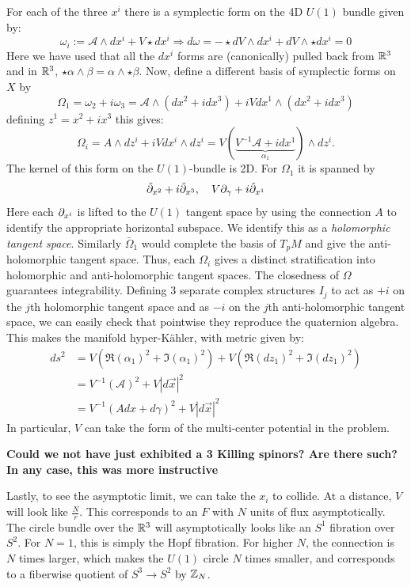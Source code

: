\documentclass[11pt, class=article, crop=false]{standalone}
\begin{document}
\begin{enumerate}
	For each of the three $x^i$ there is a symplectic form on the 4D $U(1)$ bundle given by: 
	\[
		\omega_i := \mathcal A \wedge dx^i + V \star dx^i \Rightarrow d \omega = - \star dV \wedge dx^i + dV \wedge \star dx^i = 0
	\]
	Here we have used that all the $dx^i$ forms are (canonically) pulled back from $\mathbb{R}^3$ and in $\mathbb{R}^3$, $\star \alpha \wedge \beta = \alpha \wedge \star \beta$. Now, define a different basis of symplectic forms on $X$ by
	\[
		\Omega_1 = \omega_2 + i \omega_3 = \mathcal A \wedge (dx^2 + i dx^3) + i V dx^1 \wedge (dx^2 + i dx^3) 
	\]
	defining $z^1 = x^2 + i x^3$ this gives:
	\[
		\Omega_i = A \wedge dz^i + i V dx^i \wedge dz^i = V (\underbrace{V^{-1} \mathcal A + i dx^1}_{\alpha_1}) \wedge dz^i.
	\]
	The kernel of this form on the $U(1)$-bundle is 2D. For $\Omega_1$ it is spanned by 
	\[
		\tilde {\partial}_{x^2} + i \tilde {\partial}_{x^3}, \quad V \partial_\gamma + i \tilde {\partial}_{x^1}
	\]
	Here each $\partial_{x^i}$ is lifted to the $U(1)$ tangent space by using the connection $A$ to identify the appropriate horizontal subspace. We identify this as a \emph{holomorphic tangent space}. Similarly $\bar \Omega_1$ would complete the basis of $T_p M$ and give the anti-holomorphic tangent space. Thus, each $\Omega_i$ gives a distinct stratification into holomorphic and anti-holomorphic tangent spaces. The closedness of $\Omega$ guarantees integrability. Defining 3 separate complex structures $I_j$ to act as $+i$ on the $j$th holomorphic tangent space and as $-i$ on the $j$th anti-holomorphic tangent space, we can easily check that pointwise they reproduce the quaternion algebra. This makes the manifold hyper-K\"ahler, with metric given by:
	\[
	\begin{aligned}
		ds^2 &= V (\Re(\alpha_1)^2 + \Im(\alpha_1)^2) + V (\Re(dz_1)^2 + \Im(dz_1)^2) \\
		&= V^{-1} (\mathcal A)^2 + V |d\vec x|^2 \\
		&=  V^{-1} (A dx + d \gamma)^2 + V |d\vec x|^2 
	\end{aligned}
	\]
	In particular, $V$ can take the form of the multi-center potential in the problem.

	\textbf{Could we not have just exhibited a 3 Killing spinors? Are there such? In any case, this was more instructive}
	
	Lastly, to see the asymptotic limit, we can take the $x_i$ to collide. At a distance, $V$ will look like $\frac{N}{r}$. This corresponds to an $F$ with $N$ units of flux asymptotically. The circle bundle over the $\mathbb{R}^3$ will asymptotically looks like an $S^1$ fibration over $S^2$. For $N = 1$, this is simply the Hopf fibration. For higher $N$, the connection is $N$ times larger, which makes the $U(1)$ circle $N$ times smaller, and corresponds to a fiberwise quotient of $S^3 \to S^2$ by $\mathbb{Z}_N$.
	

\end{enumerate}
\end{document}
